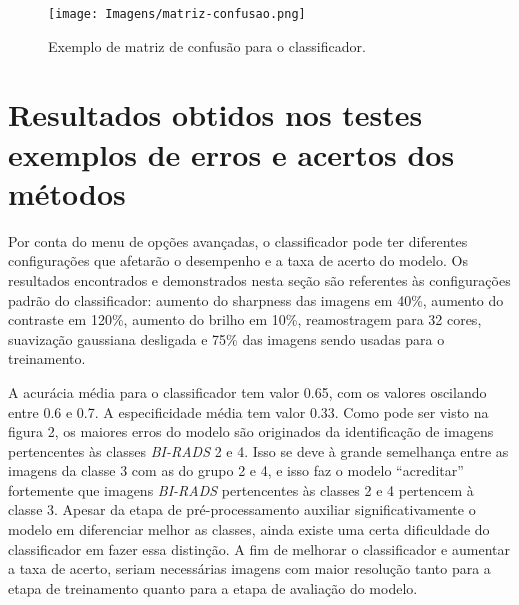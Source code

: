 \begin{figure}[h]
    \centering
    \texttt{[image: Imagens/matriz-confusao.png]}
    \caption{Exemplo de matriz de confusão para o classificador.}
\end{figure}

\newpage
\section{Resultados obtidos nos testes exemplos de erros e acertos dos métodos}

Por conta do menu de opções avançadas, o classificador pode ter diferentes 
configurações que afetarão o desempenho e a taxa de acerto do modelo. Os 
resultados encontrados e demonstrados nesta seção são referentes às configurações 
padrão do classificador: aumento do sharpness das imagens em 40\%, aumento do 
contraste em 120\%, aumento do brilho em 10\%, reamostragem para 32 cores, 
suavização gaussiana desligada e 75\% das imagens sendo usadas para o treinamento.

A acurácia média para o classificador tem valor 0.65, com os valores 
oscilando entre 0.6 e 0.7. A especificidade média tem valor 0.33. 
Como pode ser visto na figura 2, os maiores erros do modelo são originados 
da identificação de imagens pertencentes às classes \emph{BI-RADS} 2 e 4. Isso se 
deve à grande semelhança entre as imagens da classe 3 
com as do grupo 2 e 4, e isso faz o modelo “acreditar” fortemente que imagens 
\emph{BI-RADS} pertencentes às classes 2 e 4 pertencem à classe 3. Apesar da etapa de 
pré-processamento auxiliar significativamente o modelo em diferenciar melhor as 
classes, ainda existe uma certa dificuldade do classificador em fazer essa 
distinção. A fim de melhorar o classificador e aumentar a taxa de acerto, 
seriam necessárias imagens com maior resolução tanto para a etapa de treinamento 
quanto para a etapa de avaliação do modelo.
